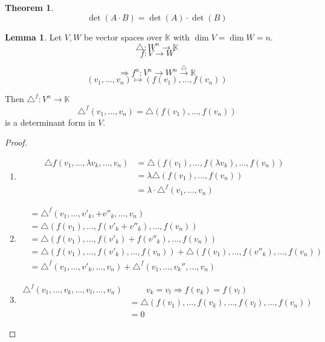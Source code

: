 \documentclass[a4paper,landscape,twocolumn]{article}
\theoremstyle{definition}
\newtheorem{theorem}{Theorem}
\newtheorem{lemma}{Lemma}
\begin{document}
\begin{theorem}
  \[ \det(A \cdot B) = \det(A) \cdot \det(B) \]
\end{theorem}
\begin{lemma}
  \label{lemma-7.25}
  Let $V, W$ be vector spaces over $\mathbb K$ with $\dim{V} = \dim{W} = n$.
  \[ \triangle: W^n \to \mathbb K \]
  \[ f: V \to W \]

  \[ \Rightarrow f^n: V^n \to W^n \overset{\triangle}\to \mathbb K \]
  \[ (v_1, \ldots, v_n) \mapsto (f(v_1), \ldots, f(v_n)) \]

  Then $\triangle^f: V^n \to \mathbb K$
  \[ \triangle^f(v_1, \ldots, v_n) = \triangle(f(v_1), \ldots, f(v_n)) \]
  is a determinant form in $V$.
\end{lemma}
\begin{proof}
  \begin{enumerate}
    \item
      \begin{align*}
        \triangle f(v_1, \ldots, \lambda v_k, \ldots, v_n)
          &= \triangle(f(v_1), \ldots, f(\lambda v_k), \ldots, f(v_n)) \\
          &= \lambda \triangle(f(v_1), \ldots, f(v_n)) \\
          &= \lambda \cdot \triangle^f (v_1, \ldots, v_n)
      \end{align*}
    \item
      \begin{align*}
          &= \triangle^f (v_1, \ldots, v'_k, + v''_k, \ldots, v_n) \\
          &= \triangle(f(v_1), \ldots, f(v'_k + v''_k), \ldots, f(v_n)) \\
          &= \triangle(f(v_1), \ldots, f(v'_k) + f(v''_k), \ldots, f(v_n)) \\
          &= \triangle(f(v_1), \ldots, f(v'_k), \ldots, f(v_n)) + \triangle(f(v_1), \ldots, f(v''_k), \ldots, f(v_n)) \\
          &= \triangle^f(v_1, \ldots, v'_k, \ldots, v_n) + \triangle^f(v_1, \ldots, v_k'', \ldots, v_n)
      \end{align*}
    \item
      \begin{align*}
        \triangle^f (v_1, \ldots, v_k, \ldots, v_l, \ldots, v_n) &\qquad v_k = v_l \Rightarrow f(v_k) = f(v_l) \\
          &= \triangle(f(v_1), \ldots, f(v_k), \ldots, f(v_l), \ldots, f(v_n)) \\
          &= 0
      \end{align*}
  \end{enumerate}
\end{proof}
\end{document}
